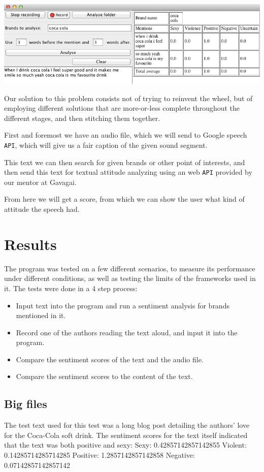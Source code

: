 \documentclass[a4paper,12pt,twoside]{ltxdoc}
\begin{document}
\begin{center}
\includegraphics[scale=0.6]{../poster/screenshot_crop.png}
\end{center}

Our solution to this problem consists not of trying to reinvent the wheel, but of employing different
solutions that are more-or-less complete throughout the different stages, and then stitching them together.

First and foremost we have an audio file, which we will send to Google speech \verb#API#, which will give us a fair caption of the given sound segment.

This text we can then search for given brands or other point of interests, and then send this text for textual attitude analyzing using an web \verb#API# provided by our mentor at Gavagai.

From here we will get a score, from which we can show the user what kind of attitude the speech had. 

\section{Results}
The program was tested on a few different scenarios, to measure its performance under different conditions, as well as testing the limits of the frameworks used in it. The tests were done in a 4 step process:

\begin{itemize}
\item Input text into the program and run a sentiment analysis for brands mentioned in it.
\item Record one of the authors reading the text aloud, and input it into the program.
\item Compare the sentiment scores of the text and the audio file.
\item Compare the sentiment scores to the content of the text.
\end{itemize}

\subsection{Big files}
The test text used for this test was a long blog post detailing the authors' love for the Coca-Cola soft drink. The sentiment scores for the text itself indicated that the text was both positive and sexy:
Sexy: 0.42857142857142855 Violent: 0.14285714285714285 Positive: 1.2857142857142858 Negative: 0.07142857142857142
\end{document}
